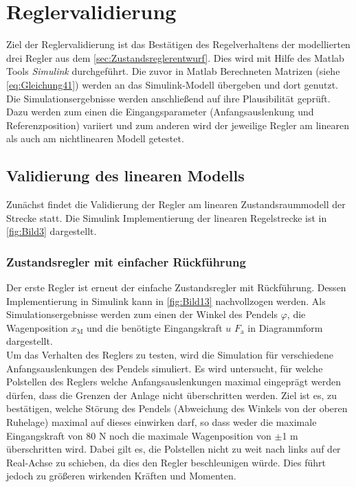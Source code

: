 \section{Reglervalidierung}

Ziel der Reglervalidierung ist das Bestätigen des Regelverhaltens der modellierten drei Regler aus dem \autoref{sec:Zustandsreglerentwurf}. Dies wird mit Hilfe des Matlab Tools \textit{Simulink} durchgeführt. Die zuvor in Matlab Berechneten Matrizen (siehe \zB \autoref{eq:Gleichung41}) werden an das Simulink-Modell übergeben und dort genutzt. Die Simulationsergebnisse werden anschließend auf ihre Plausibilität geprüft. Dazu werden zum einen die Eingangsparameter (Anfangsauslenkung und Referenzposition) variiert und zum anderen wird der jeweilige Regler am linearen als auch am nichtlinearen Modell getestet.

\subsection{Validierung des linearen Modells}

Zunächst findet die Validierung der Regler am linearen Zustandsraummodell der Strecke statt. Die Simulink Implementierung der linearen Regelstrecke ist in \autoref{fig:Bild3} dargestellt.

\subsubsection{Zustandsregler mit einfacher Rückführung} \label{sec:val-acker}

Der erste Regler ist erneut der einfache Zustandsregler mit Rückführung. Dessen Implementierung in Simulink kann in \autoref{fig:Bild13} nachvollzogen werden. Als Simulationsergebnisse werden zum einen der Winkel des Pendels $\varphi$, die Wagenposition $x_{\mathrm{M}}$ und die benötigte Eingangskraft $u$ \bzw $F_{\mathrm{a}}$ in Diagrammform dargestellt. \\
Um das Verhalten des Reglers zu testen, wird die Simulation für verschiedene Anfangsauslenkungen des Pendels simuliert. Es wird untersucht, für welche Polstellen des Reglers welche Anfangsauslenkungen maximal eingeprägt werden dürfen, dass die Grenzen der Anlage nicht überschritten werden. Ziel ist es, zu bestätigen, welche Störung des Pendels (Abweichung des Winkels von der oberen Ruhelage) maximal auf dieses einwirken darf, so dass weder die maximale Eingangskraft von 80 N noch die maximale Wagenposition von $\pm$1 m überschritten wird. Dabei gilt es, die Polstellen nicht zu weit nach links auf der Real-Achse zu schieben, da dies den Regler beschleunigen würde. Dies führt jedoch zu größeren wirkenden Kräften und Momenten.

